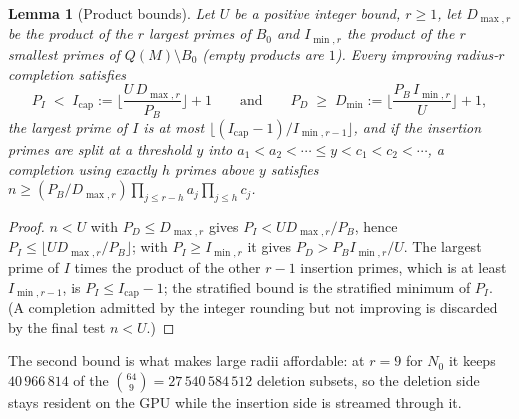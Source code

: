 \documentclass[11pt]{article}
\newtheorem{lemma}{Lemma}
\theoremstyle{definition}
\begin{document}
\begin{lemma}[Product bounds]\label{lem:prod}
Let $U$ be a positive integer bound, $r\ge1$, let $D_{\max,r}$ be the product of the $r$ largest primes
of $B_0$ and $I_{\min,r}$ the product of the $r$ smallest primes of $Q(M)\setminus B_0$ (empty products
are $1$). Every improving radius-$r$ completion satisfies
\[
  P_I \;<\; I_{\mathrm{cap}}:=\Big\lfloor\frac{U\,D_{\max,r}}{P_B}\Big\rfloor+1
  \qquad\text{and}\qquad
  P_D \;\ge\; D_{\min}:=\Big\lfloor \frac{P_B\,I_{\min,r}}{U}\Big\rfloor+1 ,
\]
the largest prime of $I$ is at most $\lfloor (I_{\mathrm{cap}}-1)/I_{\min,r-1}\rfloor$, and if the
insertion primes are split at a threshold $y$ into $a_1<a_2<\cdots\le y<c_1<c_2<\cdots$, a completion
using exactly $h$ primes above $y$ satisfies $n\ge (P_B/D_{\max,r})\prod_{j\le r-h}a_j\prod_{j\le h}c_j$.
\end{lemma}
\begin{proof}
$n<U$ with $P_D\le D_{\max,r}$ gives $P_I<U D_{\max,r}/P_B$, hence $P_I\le\lfloor U D_{\max,r}/P_B\rfloor$;
with $P_I\ge I_{\min,r}$ it gives $P_D>P_B I_{\min,r}/U$. The largest prime of $I$ times the product of
the other $r-1$ insertion primes, which is at least $I_{\min,r-1}$, is $P_I\le I_{\mathrm{cap}}-1$; the
stratified bound is the stratified minimum of $P_I$. (A completion admitted by the integer rounding but
not improving is discarded by the final test $n<U$.)
\end{proof}

The second bound is what makes large radii affordable: at $r=9$ for $N_0$ it keeps $40\,966\,814$ of
the $\binom{64}{9}=27\,540\,584\,512$ deletion subsets, so the deletion side stays resident on the GPU
while the insertion side is streamed through it.
\end{document}
